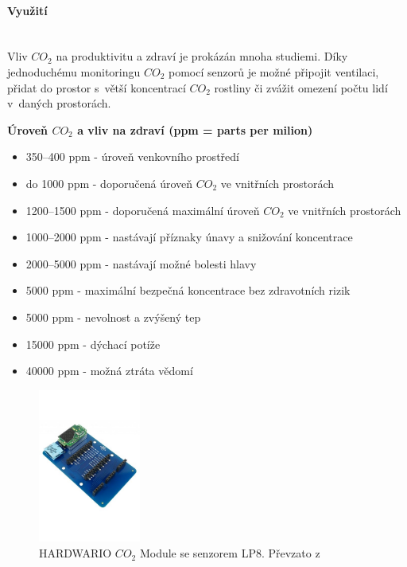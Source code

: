 \paragraph*{Využití}\mbox{} \\
Vliv $CO_2$ na produktivitu a zdraví je prokázán mnoha studiemi\cite{co2-studies}. Díky jednoduchému monitoringu $CO_2$ pomocí senzorů je možné připojit ventilaci, přidat do prostor s~větší koncentrací $CO_2$ rostliny či zvážit omezení počtu lidí v~daných prostorách.

\textbf{Úroveň $CO_2$ a vliv na zdraví (ppm = parts per milion)\cite{co2-values}}
\begin{itemize}
  \item 350--400 ppm - úroveň venkovního prostředí
  \item do 1000 ppm - doporučená úroveň $CO_2$ ve vnitřních prostorách
  \item 1200--1500 ppm - doporučená maximální úroveň $CO_2$ ve vnitřních prostorách
  \item 1000--2000 ppm - nastávají příznaky únavy a snižování koncentrace
  \item 2000--5000 ppm - nastávají možné bolesti hlavy
  \item 5000 ppm - maximální bezpečná koncentrace bez zdravotních rizik
  \item 5000 ppm - nevolnost a zvýšený tep
  \item 15000 ppm - dýchací potíže
  \item 40000 ppm - možná ztráta vědomí 
  \end{itemize}

\begin{figure}[H]
    \centering
    \includegraphics[width=0.3\textwidth]{obrazky-figures/hardwareComponents/co2Module.jpg}
    \caption{HARDWARIO $CO_2$ Module se senzorem LP8. Převzato z~\cite{hardwario-module-overview}}
    \label{hardwarioCO2Module}
  \end{figure}

